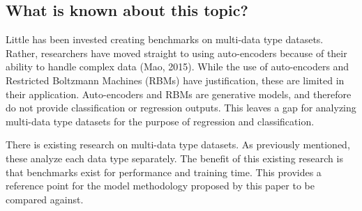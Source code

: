 \subsection{What is known about this topic?}

Little has been invested creating benchmarks on multi-data type datasets.  Rather, researchers have moved straight to using auto-encoders because of their ability to handle complex data (Mao, 2015).  While the use of auto-encoders and Restricted Boltzmann Machines (RBMs) have justification, these are limited in their application.  Auto-encoders and RBMs are generative models, and therefore do not provide classification or regression outputs.  This leaves a gap for analyzing multi-data type datasets for the purpose of regression and classification.

There is existing research on multi-data type datasets.  As previously mentioned, these analyze each data type separately.  The benefit of this existing research is that benchmarks exist for performance and training time.  This provides a reference point for the model methodology proposed by this paper to be compared against.  



